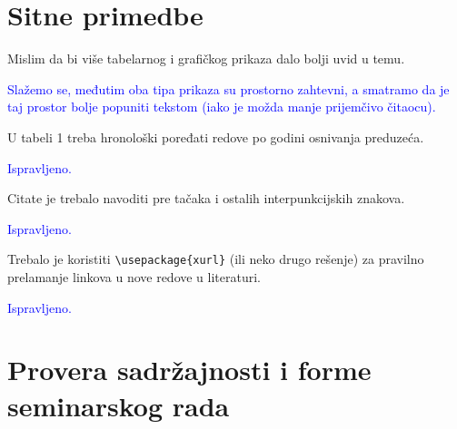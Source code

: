 \documentclass[a4paper]{report}
\newcommand{\odgovor}[1]{\textcolor{blue}{#1}}
\begin{document}
\section{Sitne primedbe}

Mislim da bi više tabelarnog i grafičkog prikaza dalo bolji uvid u temu. 

\odgovor{Slažemo se, međutim oba tipa prikaza su prostorno zahtevni, a smatramo da je taj prostor bolje popuniti tekstom (iako je možda manje prijemčivo čitaocu).}

U tabeli 1 treba hronološki poređati redove po godini osnivanja preduzeća.

\odgovor{Ispravljeno.}

Citate je trebalo navoditi pre tačaka i ostalih interpunkcijskih znakova.

\odgovor{Ispravljeno.}

Trebalo je koristiti \verb|\usepackage{xurl}| (ili neko drugo rešenje) za pravilno prelamanje linkova u nove redove u literaturi.

\odgovor{Ispravljeno.}

\section{Provera sadržajnosti i forme seminarskog rada}
\end{document}
